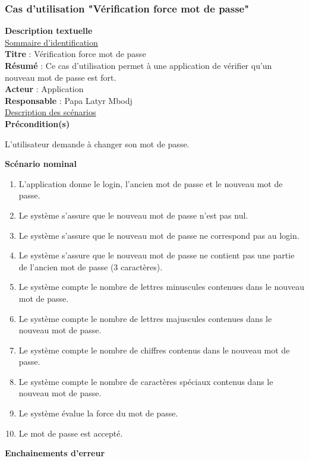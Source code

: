 \subsubsection{Cas d'utilisation "Vérification force mot de passe"}
\textbf{\RIGHTarrow Description textuelle}\\
\underline{\underline{Sommaire d’identification}} \\
\textbf{Titre} : Vérification force mot de passe\\
\textbf{Résumé} : Ce cas d’utilisation permet à une application de vérifier qu'un nouveau mot de passe est fort.\\
\textbf{Acteur} : Application\\	
\textbf{Responsable} : Papa Latyr Mbodj\\
\underline{\underline{Description des scénarios}}\\
\textbf{Précondition(s)}
\begin{itemize}
	\itemtirait L'utilisateur demande à changer son mot de passe.
\end{itemize}
\textbf{Scénario nominal}
\begin{enumerate}
	\item L'application donne le login, l'ancien mot de passe et le nouveau mot de passe.
	\item Le système s'assure que le nouveau mot de passe n'est pas nul.
	\item Le système s'assure que le nouveau mot de passe ne correspond pas au login.
	\item Le système s'assure que le nouveau mot de passe ne contient pas une partie de l'ancien mot de passe (3 caractères).
	\item Le système compte le nombre de lettres minuscules contenues dans le nouveau mot de passe.
	\item Le système compte le nombre de lettres majuscules contenues dans le nouveau mot de passe.
	\item Le système compte le nombre de chiffres contenus dans le nouveau mot de passe.
	\item Le système compte le nombre de caractères spéciaux contenus dans le nouveau mot de passe.
	\item Le système évalue la force du mot de passe.
	\item Le mot de passe est accepté.
\end{enumerate}
\textbf{Enchainements d’erreur}\\
